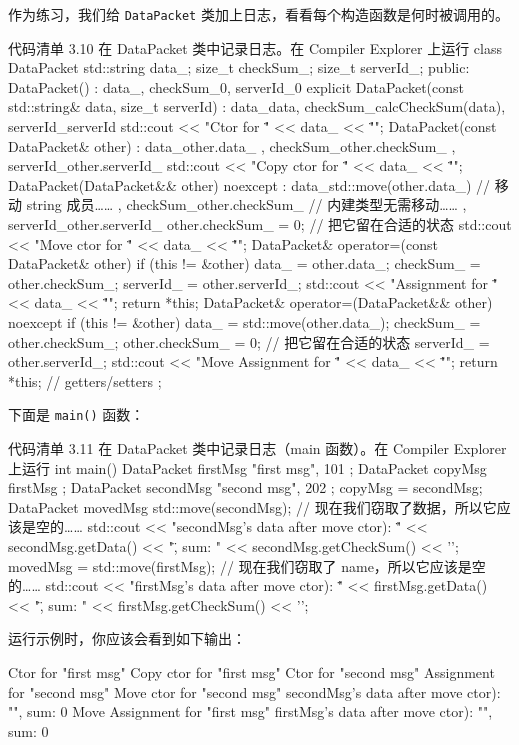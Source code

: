 作为练习，我们给 \texttt{DataPacket} 类加上日志，看看每个构造函数是何时被调用的。

\begin{codeboxt}[cpp]{代码清单 3.10 在 DataPacket 类中记录日志。在 Compiler Explorer 上运行}
class DataPacket {
std::string data_;
size_t checkSum_;
size_t serverId_;
public:
DataPacket() : data_{}, checkSum_{0}, serverId_{0} { }
explicit DataPacket(const std::string& data, size_t serverId)
: data_{data}, checkSum_{calcCheckSum(data)}, serverId_{serverId} {
std::cout << "Ctor for \"" << data_ << "\"\n";
}
DataPacket(const DataPacket& other)
: data_{other.data_}
, checkSum_{other.checkSum_}
, serverId_{other.serverId_} {
std::cout << "Copy ctor for \"" << data_ << "\"\n";
}
DataPacket(DataPacket&& other) noexcept
: data_{std::move(other.data_)}
// 移动 string 成员……
, checkSum_{other.checkSum_}
// 内建类型无需移动……
, serverId_{other.serverId_} {
other.checkSum_ = 0; // 把它留在合适的状态
std::cout << "Move ctor for \"" << data_ << "\"\n";
}
DataPacket& operator=(const DataPacket& other) {
if (this != &other) {
data_ = other.data_;
checkSum_ = other.checkSum_;
serverId_ = other.serverId_;
std::cout << "Assignment for \"" << data_ << "\"\n";
}
return *this;
}
DataPacket& operator=(DataPacket&& other) noexcept {
if (this != &other) {
data_ = std::move(other.data_);
checkSum_ = other.checkSum_;
other.checkSum_ = 0; // 把它留在合适的状态
serverId_ = other.serverId_;
std::cout << "Move Assignment for \"" << data_ << "\"\n";
}
return *this;
}
// getters/setters
};
\end{codeboxt}

下面是 \texttt{main()} 函数：

\begin{codeboxt}[cpp]{代码清单 3.11 在 DataPacket 类中记录日志（main 函数）。在 Compiler Explorer 上运行}
int main() {
DataPacket firstMsg {"first msg", 101 };
DataPacket copyMsg { firstMsg };
DataPacket secondMsg { "second msg", 202 };
copyMsg = secondMsg;
DataPacket movedMsg { std::move(secondMsg)};
// 现在我们窃取了数据，所以它应该是空的……
std::cout << "secondMsg's data after move ctor): \""
<< secondMsg.getData() << "\", sum: "
<< secondMsg.getCheckSum() << '\n';
movedMsg = std::move(firstMsg);
// 现在我们窃取了 name，所以它应该是空的……
std::cout << "firstMsg's data after move ctor): \""
<< firstMsg.getData() << "\", sum: "
<< firstMsg.getCheckSum() << '\n';
}
\end{codeboxt}

运行示例时，你应该会看到如下输出：

\begin{codebox}[cpp]
Ctor for "first msg"
Copy ctor for "first msg"
Ctor for "second msg"
Assignment for "second msg"
Move ctor for "second msg"
secondMsg's data after move ctor): "", sum: 0
Move Assignment for "first msg"
firstMsg's data after move ctor): "", sum: 0
\end{codebox}

